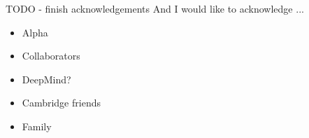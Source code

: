 
\begin{acknowledgements}
TODO - finish acknowledgements
And I would like to acknowledge ...

\begin{itemize}
    \item Alpha
    \item Collaborators
    \item DeepMind?
    \item Cambridge friends
    \item Family
\end{itemize}

\end{acknowledgements}
